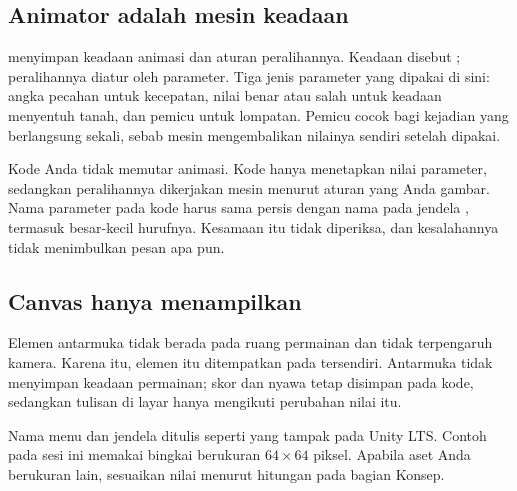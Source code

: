 \subsection*{Animator adalah mesin keadaan}

 menyimpan keadaan animasi dan aturan peralihannya. Keadaan
disebut ; peralihannya diatur oleh parameter. Tiga
jenis parameter yang dipakai di sini: angka pecahan untuk kecepatan, nilai
benar atau salah untuk keadaan menyentuh tanah, dan pemicu untuk lompatan.
Pemicu cocok bagi kejadian yang berlangsung sekali, sebab mesin mengembalikan
nilainya sendiri setelah dipakai.

Kode Anda tidak memutar animasi. Kode hanya menetapkan nilai parameter,
sedangkan peralihannya dikerjakan mesin menurut aturan yang Anda gambar. Nama
parameter pada kode harus sama persis dengan nama pada jendela
, termasuk besar-kecil hurufnya. Kesamaan itu tidak
diperiksa, dan kesalahannya tidak menimbulkan pesan apa pun.

\subsection*{Canvas hanya menampilkan}

Elemen antarmuka tidak berada pada ruang permainan dan tidak terpengaruh
kamera. Karena itu, elemen itu ditempatkan pada  tersendiri.
Antarmuka tidak menyimpan keadaan permainan; skor dan nyawa tetap disimpan pada
kode, sedangkan tulisan di layar hanya mengikuti perubahan nilai itu.


Nama menu dan jendela ditulis seperti yang tampak pada Unity LTS. Contoh pada
sesi ini memakai bingkai berukuran $64 \times 64$ piksel. Apabila aset Anda
berukuran lain, sesuaikan nilai  menurut hitungan pada
bagian Konsep.

